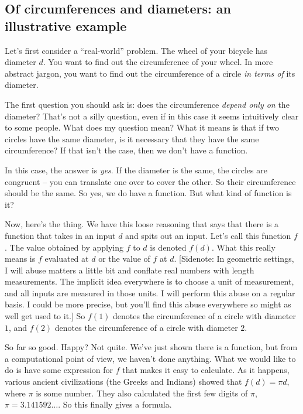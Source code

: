 \documentclass{amsart}
\begin{document}
\subsection{Of circumferences and diameters: an illustrative example}

Let's first consider a ``real-world'' problem. The wheel of your
bicycle has diameter $d$. You want to find out the circumference of
your wheel. In more abstract jargon, you want to find out the
circumference of a circle {\em in terms of} its diameter.

The first question you should ask is: does the circumference {\em depend
only on} the diameter? That's not a silly question, even if in this
case it seems intuitively clear to some people. What does my question
mean? What it means is that if two circles have the same diameter, is
it necessary that they have the same circumference? If that isn't the
case, then we don't have a function.

In this case, the answer is {\em yes}. If the diameter is the same,
the circles are congruent -- you can translate one over to cover the
other. So their circumference should be the same. So yes, we do have a
function. But what kind of function is it?

Now, here's the thing. We have this loose reasoning that says that
there is a function that takes in an input $d$ and spits out an
input. Let's call this function $f$. The value obtained by applying
$f$ to $d$ is denoted $f(d)$. What this really means is $f$ evaluated
at $d$ or the value of $f$ at $d$. [Sidenote: In geometric settings, I
will abuse matters a little bit and conflate real numbers with length
measurements. The implicit idea everywhere is to choose a unit of
measurement, and all inputs are measured in those units. I will
perform this abuse on a regular basis. I could be more precise, but
you'll find this abuse everywhere so might as well get used to it.] So
$f(1)$ denotes the circumference of a circle with diameter $1$, and
$f(2)$ denotes the circumference of a circle with diameter $2$.

So far so good. Happy? Not quite. We've just shown there is a
function, but from a computational point of view, we haven't done
anything. What we would like to do is have some expression for $f$
that makes it easy to calculate. As it happens, various ancient
civilizations (the Greeks and Indians) showed that $f(d) = \pi d$,
where $\pi$ is some number. They also calculated the first few digits
of $\pi$, $\pi = 3.141592 \dots$. So this finally gives a formula.
\end{document}
